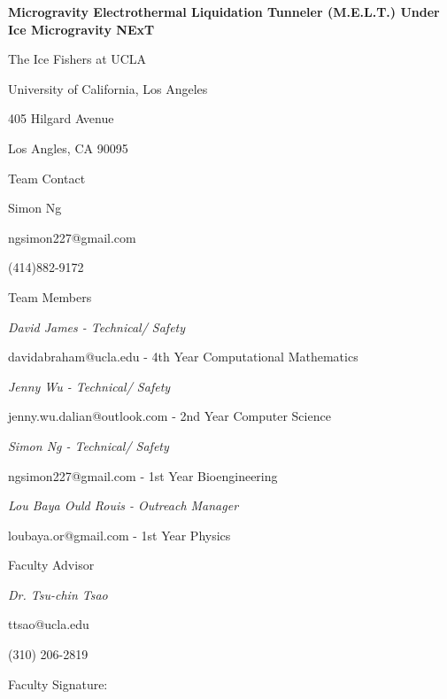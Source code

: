 \documentclass{article}
\begin{document}
\begin{titlepage}
\begin{center}

    \vspace{3cm}
    {\huge\bfseries Microgravity Electrothermal Liquidation Tunneler (M.E.L.T.) 
    Under Ice Microgravity NExT\par}
    
    \vspace{2cm}
    {\huge The Ice Fishers at UCLA\par}
    {\huge University of California, Los Angeles\par} 
    {\huge 405 Hilgard Avenue\par}
    {\huge Los Angles, CA 90095\par}
    
    \vspace{1cm}
    {\Large Team Contact\par}
    \vspace{.25cm}
    {\large Simon Ng\par}
    {\large ngsimon227@gmail.com\par}
    {\large (414)882-9172\par}
    
    
    \vspace{1cm}
    {\Large Team Members\par}
    \vspace{.25cm}
    {\large\itshape David James - Technical/ Safety\par}
    {\large davidabraham@ucla.edu - 4th Year Computational Mathematics\par}
    \vspace{.25cm}
    {\large\itshape Jenny Wu - Technical/ Safety\par}
    {\large jenny.wu.dalian@outlook.com - 2nd Year Computer Science\par}
    \vspace{.25cm}
    {\large\itshape Simon Ng - Technical/ Safety\par}
    {\large ngsimon227@gmail.com - 1st Year Bioengineering\par}
    \vspace{.25cm}
    {\large\itshape Lou Baya Ould Rouis - Outreach Manager\par}
    {\large loubaya.or@gmail.com - 1st Year Physics\par}
    
    \vspace{1cm}
    {\Large Faculty Advisor \par}
    \vspace{.25cm}
    {\large\itshape Dr. Tsu-chin Tsao \par}
    {\large ttsao@ucla.edu \par}
    {\large (310) 206-2819 \par}
    \vspace{1cm}
    Faculty Signature: \hrulefill


\end{center}
\end{titlepage}
\end{document}
